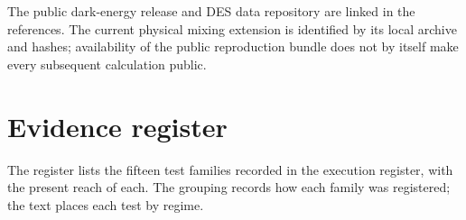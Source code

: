 The public dark-energy release and DES data repository are linked in the
references. The current physical mixing extension is identified by its
local archive and hashes; availability of the public reproduction bundle
does not by itself make every subsequent calculation public.

\section{Evidence register}
\label{app:register}

The register lists the fifteen test families recorded in the execution
register, with the present reach of each. The grouping records how each
family was registered; the text places each test by regime.

\begingroup\small
\setlength{\tabcolsep}{4pt}
\renewcommand{\arraystretch}{1.10}

